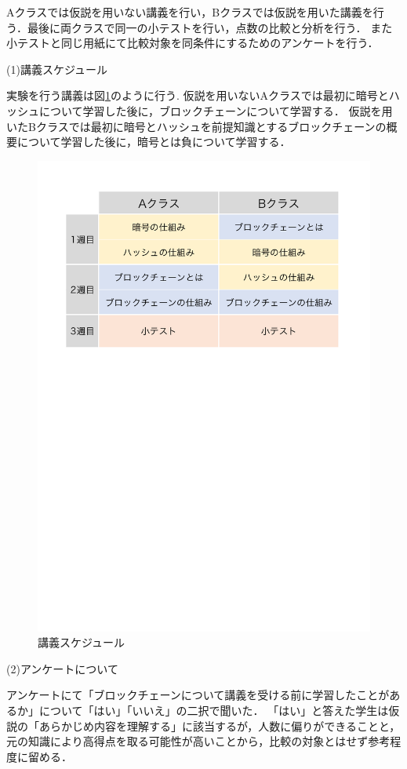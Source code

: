 \documentclass[a4j,12pt]{jsarticle}
\begin{document}
Aクラスでは仮説を用いない講義を行い，Bクラスでは仮説を用いた講義を行う．最後に両クラスで同一の小テストを行い，点数の比較と分析を行う．
また小テストと同じ用紙にて比較対象を同条件にするためのアンケートを行う．

(1)講義スケジュール

実験を行う講義は図\ref{fig:timeline}のように行う.
仮説を用いないAクラスでは最初に暗号とハッシュについて学習した後に，ブロックチェーンについて学習する．
仮説を用いたBクラスでは最初に暗号とハッシュを前提知識とするブロックチェーンの概要について学習した後に，暗号とは負について学習する．

\begin{figure}[H]
\centering
\includegraphics[mediaboxonly=/CropBox,width=12cm]{timeline.pdf}
\caption{講義スケジュール}
\label{fig:timeline}
\end{figure} 

(2)アンケートについて

アンケートにて「ブロックチェーンについて講義を受ける前に学習したことがあるか」について「はい」「いいえ」の二択で聞いた．
「はい」と答えた学生は仮説の「あらかじめ内容を理解する」に該当するが，人数に偏りができることと，元の知識により高得点を取る可能性が高いことから，比較の対象とはせず参考程度に留める．
\end{document}
